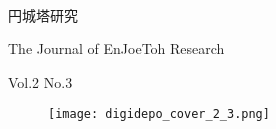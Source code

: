 \documentclass[10pt, a5paper, twoside]{jsarticle}
\theoremstyle{definition}
\begin{document}
	\begin{center}

		~

		\fontsize{43pt}{20mm}\selectfont
		円城塔研究

		\vspace{3mm}

		\LARGE{The Journal of EnJoeToh Research}

		\vspace{3mm}

		\normalsize{Vol.2 No.3}

	\end{center}

	\vspace{10mm}

	\begin{figure}[h]

		\texttt{[image: digidepo\_cover\_2\_3.png]}
		
	\end{figure}{}

	\newpage

	\thispagestyle{empty}
	
	~
	
	\newpage
\end{document}
